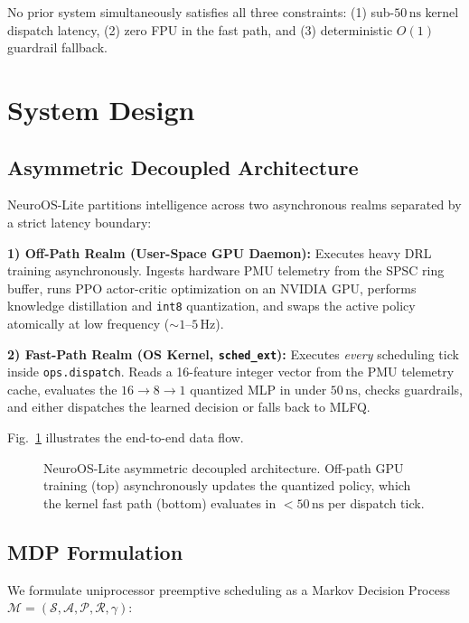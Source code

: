 No prior system simultaneously satisfies all three constraints: (1)
sub-$50\,\text{ns}$ kernel dispatch latency, (2) zero FPU in the fast
path, and (3) deterministic $O(1)$ guardrail fallback.

\section{System Design}
\label{sec:design}

\subsection{Asymmetric Decoupled Architecture}

NeuroOS-Lite partitions intelligence across two asynchronous realms separated
by a strict latency boundary:

\smallskip
\noindent\textbf{1) Off-Path Realm (User-Space GPU Daemon):} Executes heavy DRL training
asynchronously. Ingests hardware PMU telemetry from the SPSC ring buffer,
runs PPO actor-critic optimization on an NVIDIA GPU, performs
knowledge distillation and \texttt{int8} quantization, and swaps the
active policy atomically at low frequency ($\sim 1\text{--}5\,\text{Hz}$).

\smallskip
\noindent\textbf{2) Fast-Path Realm (OS Kernel, \texttt{sched\_ext}):} Executes
\emph{every} scheduling tick inside \texttt{ops.dispatch}. Reads a
16-feature integer vector from the PMU telemetry cache, evaluates the
$16\to 8\to 1$ quantized MLP in under $50\,\text{ns}$, checks
guardrails, and either dispatches the learned decision or falls back to
MLFQ.

\smallskip
Fig.~\ref{fig:arch} illustrates the end-to-end data flow.

\begin{figure}[t]
  \centering
  \caption{NeuroOS-Lite asymmetric decoupled architecture. Off-path GPU training
    (top) asynchronously updates the quantized policy, which the kernel fast
    path (bottom) evaluates in $<50\,\text{ns}$ per dispatch tick.}
  \label{fig:arch}
\end{figure}

\subsection{MDP Formulation}
\label{subsec:mdp}

We formulate uniprocessor preemptive scheduling as a Markov Decision Process
$\mathcal{M} = (\mathcal{S}, \mathcal{A}, \mathcal{P}, \mathcal{R}, \gamma)$:

